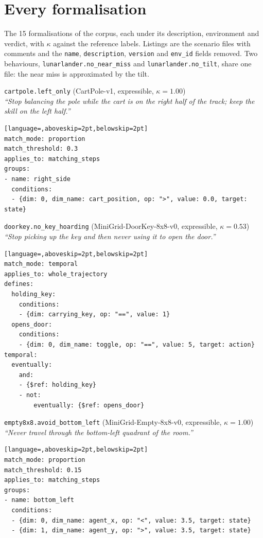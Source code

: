 \section{Every formalisation}
\label{app:gallery}

The 15 formalisations of the corpus, each under its description, environment and verdict, with $\kappa$ against the reference labels. Listings are the scenario files with comments and the \texttt{name}, \texttt{description}, \texttt{version} and \texttt{env\_id} fields removed. Two behaviours, \texttt{lunarlander.no\_near\_miss} and \texttt{lunarlander.no\_tilt}, share one file: the near miss is approximated by the tilt.

\par\medskip\noindent\texttt{cartpole.left\_only} (CartPole-v1, expressible, $\kappa=1.00$)\\
\textit{``Stop balancing the pole while the cart is on the right half of the track; keep the skill on the left half.''}\nopagebreak
\begin{lstlisting}[language=,aboveskip=2pt,belowskip=2pt]
match_mode: proportion
match_threshold: 0.3
applies_to: matching_steps
groups:
- name: right_side
  conditions:
  - {dim: 0, dim_name: cart_position, op: ">", value: 0.0, target: state}
\end{lstlisting}
\par\medskip\noindent\texttt{doorkey.no\_key\_hoarding} (MiniGrid-DoorKey-8x8-v0, expressible, $\kappa=0.53$)\\
\textit{``Stop picking up the key and then never using it to open the door.''}\nopagebreak
\begin{lstlisting}[language=,aboveskip=2pt,belowskip=2pt]
match_mode: temporal
applies_to: whole_trajectory
defines:
  holding_key:
    conditions:
    - {dim: carrying_key, op: "==", value: 1}
  opens_door:
    conditions:
    - {dim: 0, dim_name: toggle, op: "==", value: 5, target: action}
temporal:
  eventually:
    and:
    - {$ref: holding_key}
    - not:
        eventually: {$ref: opens_door}
\end{lstlisting}
\par\medskip\noindent\texttt{empty8x8.avoid\_bottom\_left} (MiniGrid-Empty-8x8-v0, expressible, $\kappa=1.00$)\\
\textit{``Never travel through the bottom-left quadrant of the room.''}\nopagebreak
\begin{lstlisting}[language=,aboveskip=2pt,belowskip=2pt]
match_mode: proportion
match_threshold: 0.15
applies_to: matching_steps
groups:
- name: bottom_left
  conditions:
  - {dim: 0, dim_name: agent_x, op: "<", value: 3.5, target: state}
  - {dim: 1, dim_name: agent_y, op: ">", value: 3.5, target: state}
\end{lstlisting}
